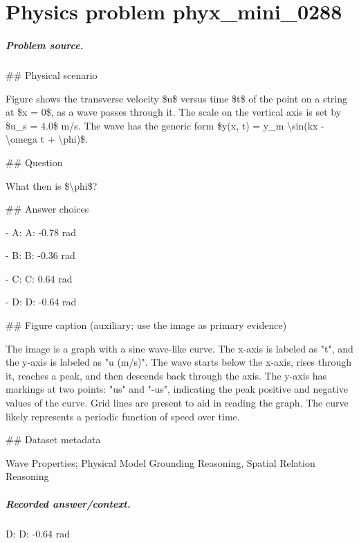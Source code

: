 
\chapter{Physics problem phyx\_mini\_0288}
\label{ch:PhyXMiniProblems_problem_phyx_mini_0288}

\paragraph{Problem source.}
\#\# Physical scenario

Figure shows the transverse velocity \$u\$ versus time \$t\$ of the point on a string at \$x = 0\$, as a wave passes through it. The scale on the vertical axis is set by \$u\_s = 4.0\$ m/s. The wave has the generic form \$y(x, t) = y\_m \textbackslash{}sin(kx - \textbackslash{}omega t + \textbackslash{}phi)\$.

\#\# Question

What then is \$\textbackslash{}phi\$?

\#\# Answer choices

- A: A: -0.78 rad

- B: B: -0.36 rad

- C: C: 0.64 rad

- D: D: -0.64 rad

\#\# Figure caption (auxiliary; use the image as primary evidence)

The image is a graph with a sine wave-like curve. The x-axis is labeled as "t", and the y-axis is labeled as "u (m/s)". The wave starts below the x-axis, rises through it, reaches a peak, and then descends back through the axis. The y-axis has markings at two points: "us" and "-us", indicating the peak positive and negative values of the curve. Grid lines are present to aid in reading the graph. The curve likely represents a periodic function of speed over time.

\#\# Dataset metadata

Wave Properties; Physical Model Grounding Reasoning, Spatial Relation Reasoning

\paragraph{Recorded answer/context.}
D: D: -0.64 rad

